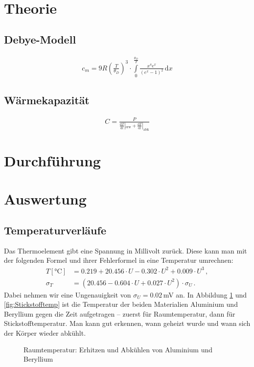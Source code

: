 \documentclass[12pt,a4paper,titlepage,headinclude,bibtotoc]{scrartcl}
\newcommand{\dif}{\ensuremath{\mathrm{d}}}
\begin{document}
\section{Theorie}
\label{sec:theorie}

\subsection{Debye-Modell}
\begin{align}
	c_m=9R \left(\frac{T}{\theta_D}\right)^3\cdot\int\limits_0^\frac{\theta_D}{T} \frac{x^4 e^x}{(e^x-1)^2} \,\dif x
	\label{eq:debye}
\end{align}

\subsection{Wärmekapazität}
\begin{align}
	C=\frac{P}{\frac{\dif T}{\dif t}|_\text{erw}+\frac{\dif T}{\dif t}|_\text{abk}}
	\label{eq:molWaerme}
\end{align}

\section{Durchführung}
\label{sec:durchfuehrung}

\section{Auswertung}
\label{sec:auswertung}
\subsection{Temperaturverläufe}
Das Thermoelement gibt eine Spannung in Millivolt zurück.
Diese kann man mit der folgenden Formel und ihrer Fehlerformel in eine Temperatur umrechnen:
\begin{align}
	T[\si{\celsius}]&=0.219+20.456 \cdot U - 0.302\cdot U^2+0.009\cdot U^3 \,, \\
	\sigma_T&=(20.456 - 0.604\cdot U+0.027\cdot U^2)\cdot \sigma_U\,.
\end{align}
Dabei nehmen wir eine Ungenauigkeit von $\sigma_U=0.02\,$mV an.
In Abbildung \ref{fig:Raumtemp} und \ref{fig:Stickstofftemp} ist die Temperatur der beiden Materialien Aluminium und Beryllium gegen die Zeit aufgetragen -- zuerst für Raumtemperatur, dann für Stickstofftemperatur.
Man kann gut erkennen, wann geheizt wurde und wann sich der Körper wieder abkühlt.
\begin{figure}[!htb]
	\centering
	
	\caption{Raumtemperatur: Erhitzen und Abkühlen von Aluminium und Beryllium}
	\label{fig:Raumtemp}
\end{figure}
\end{document}

